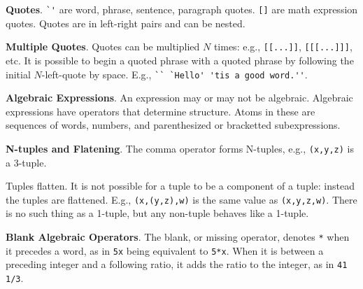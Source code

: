 \documentclass[12pt]{article}
\begin{document}
\begin{list}{}{}

\item
{\bf Quotes}.  \verb|`'| are word, phrase, sentence, paragraph quotes.
\verb|[]| are math expression quotes.   Quotes are in left-right pairs
and can be nested.

\item
{\bf Multiple Quotes}.  Quotes can be multiplied $N$ times: e.g.,
\verb|[[...]]|, \verb|[[[...]]]|, etc.  It is possible to begin a quoted
phrase with a quoted phrase by following the initial $N$-left-quote by
space.  E.g., \verb|`` `Hello' 'tis a good word.''|.

\item
{\bf Algebraic Expressions}.
An expression may or may not be algebraic.  Algebraic expressions have
operators that determine structure.  Atoms in these are sequences of
words, numbers, and parenthesized or bracketted subexpressions.

\item
{\bf N-tuples and Flatening}.
The comma operator forms N-tuples, e.g., \verb|(x,y,z)| is a 3-tuple.

Tuples flatten.  It is not possible for a tuple to be a component of
a tuple: instead the tuples are flattened.  E.g., \verb|(x,(y,z),w)|
is the same value as \verb|(x,y,z,w)|.  There is no such thing as a
1-tuple, but any non-tuple behaves like a 1-tuple.

\item
{\bf Blank Algebraic Operators}.
The blank, or missing operator, denotes \verb|*| when it precedes a word,
as in \verb|5x| being equivalent to \verb|5*x|.  When it is between a
preceding integer and a following ratio, it adds the ratio to the integer,
as in \verb|41 1/3|.

\end{list}






\printindex
\end{document}
